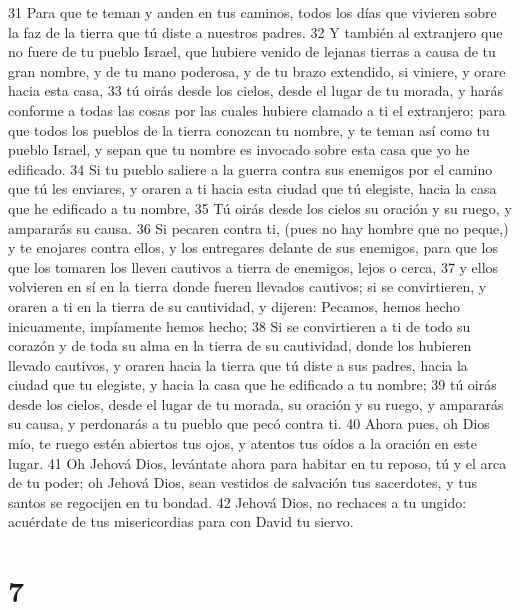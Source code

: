 31 Para que te teman y anden en tus caminos, todos los días que vivieren sobre la faz de la tierra que tú diste a nuestros padres.
32 Y también al extranjero que no fuere de tu pueblo Israel, que hubiere venido de lejanas tierras a causa de tu gran nombre, y de tu mano poderosa, y de tu brazo extendido, si viniere, y orare hacia esta casa,
33  tú oirás desde los cielos, desde el lugar de tu morada, y harás conforme a todas las cosas por las cuales hubiere clamado a ti el extranjero; para que todos los pueblos de la tierra conozcan tu nombre, y te teman así como tu pueblo Israel, y sepan que tu nombre es invocado sobre esta casa que yo he edificado. 
34 Si tu pueblo saliere a la guerra contra sus enemigos por el camino que tú les enviares, y oraren a ti hacia esta ciudad que tú elegiste, hacia la casa que he edificado a tu nombre,
35 Tú oirás desde los cielos su oración y su ruego, y ampararás su causa.
36 Si pecaren contra ti, (pues no hay hombre que no peque,) y te enojares contra ellos, y los entregares delante de sus enemigos, para que los que los tomaren los lleven cautivos a tierra de enemigos, lejos o cerca,
37 y ellos volvieren en sí en la tierra donde fueren llevados cautivos; si se convirtieren, y oraren a ti en la tierra de su cautividad, y dijeren: Pecamos, hemos hecho inicuamente, impíamente hemos hecho;
38 Si se convirtieren a ti de todo su corazón y de toda su alma en la tierra de su cautividad, donde los hubieren llevado cautivos, y oraren hacia la tierra que tú diste a sus padres, hacia la ciudad que tu elegiste, y hacia la casa que he edificado a tu nombre;
39 tú oirás desde los cielos, desde el lugar de tu morada, su oración y su ruego, y ampararás su causa, y perdonarás a tu pueblo que pecó contra ti.
40 Ahora pues, oh Dios mío, te ruego estén abiertos tus ojos, y atentos tus oídos a la oración en este lugar.
41 Oh Jehová Dios, levántate ahora para habitar en tu reposo, tú y el arca de tu poder; oh Jehová Dios, sean vestidos de salvación tus sacerdotes, y tus santos se regocijen en tu bondad.
42 Jehová Dios, no rechaces a tu ungido: acuérdate de tus misericordias para con David tu siervo. 

\chapter{7}



